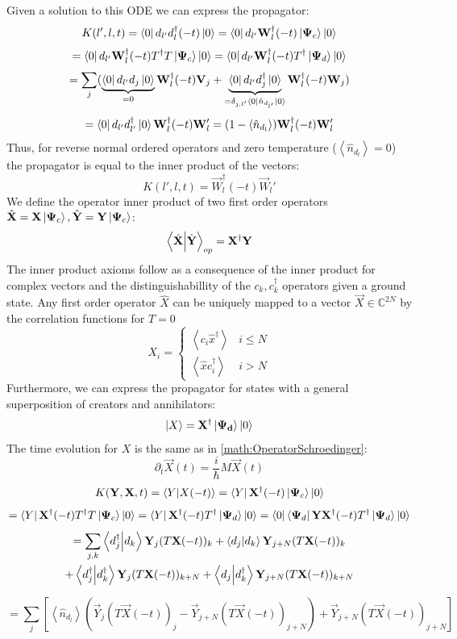 \documentclass[Master]{subfiles}
\begin{document}
Given a  solution to this ODE we can express the propagator:
$$
K(l',l,t) =
\bra{0}d_{l'}
d^{\dag}_l(-t)\ket{0} 
= 
\bra{0}d_{l'}\mathbf{W}^{\dag}_l(-t)\ket{\mathbf{\Psi}_c}\ket{0} 
$$
$$
= 
\bra{0}d_{l'}\mathbf{W}^{\dag}_l(-t)T^{\dag} T \ket{\mathbf{\Psi}_c}\ket{0} 
=
\bra{0}d_{l'}\mathbf{W}^{\dag}_l(-t)T^{\dag} \ket{\mathbf{\Psi}_d}\ket{0}
$$
$$
= \sum_j ( \underbrace{\bra{0}d_{l'}d_{j}\ket{0}}_{=0} \mathbf{W}^{\dag}_l(-t) \mathbf{V}_j + \underbrace{\bra{0}d_{l'}d^{\dag}_{j}\ket{0}}_{= \delta_{j,l'}\bra{0}\hat{n}_{d_{l'}}\ket{0}}\mathbf{W}^{\dag}_l(-t) \mathbf{W}_j) 
$$
$$
= \bra{0}d_{l'}d^{\dag}_{l'}\ket{0} \mathbf{W}^{\dag}_l(-t) \mathbf{W}_l'  = (1- \left< \hat{n}_{d_l}\right>)\mathbf{W}^{\dag}_l(-t) \mathbf{W}_l' 
$$
Thus, for reverse normal ordered operators and zero temperature ($\left< \hat{n}_{d_l}\right>=0$) the propagator is equal to the inner product of the vectors:
\begin{dmath}\label{BdG:Prop=Scal}
 K(l',l,t) = \vec{W}^{\dag}_l(-t) \vec{W}_l'
\end{dmath}
We define the operator inner product of two first order operators \\ $\hat{\mathbf{X}} = \mathbf{X}\ket{\mathbf{\Psi}_c},\hat{\mathbf{Y}}= \mathbf{Y}\ket{\mathbf{\Psi}_c}$:
$$\braket{\hat{\mathbf{X}}}{{\hat{\mathbf{Y}}}}_{op} = \mathbf{X}^{\dag}\mathbf{Y}$$
The inner product axioms follow as a consequence of the inner product for complex vectors and the distinguishabillity of the $c_k,c_k^{\dag}$ operators given a ground state.
Any first order operator $\hat{X}$ can be uniquely mapped to a vector $\vec{X} \in \mathbb{C}^{2 N}$ by the correlation functions for $T=0$
$$
X_i = \begin{cases}
\left< c_i \hat{x}^{\dag} \right> & i \leq N\\
\left< \hat{x} c_i^{\dag}\right> & i > N
\end{cases}
$$
Furthermore, we can express the propagator for states with a general superposition of creators and annihilators:\\ $$\ket{X}=\mathbf{X}^{\dag}\ket{\mathbf{\Psi_d}}\ket{0}$$
The time evolution for $X$ is the same as in \eqref{math:OperatorSchroedinger}:
$$
\partial_t  \vec{X}(t) = \frac{i}{\hbar} M  \vec{X}(t)
$$
$$
K(\mathbf{Y},\mathbf{X},t) 
= \braket{Y}{X(-t)}
=
\bra{Y}\mathbf{X}^{\dag}(-t)\ket{\mathbf{\Psi}_c}\ket{0} 
$$
$$
= 
\bra{Y}\vec{X}^{\dag}(-t)T^{\dag} T \ket{\vec{\Psi}_c}\ket{0} 
=
\bra{Y}\vec{X}^{\dag}(-t)T^{\dag} \ket{\vec{\Psi}_d}\ket{0}
=\bra{0}\bra{\vec{\Psi}_d}\Vec{Y}\vec{X}^{\dag}(-t)T^{\dag} \ket{\vec{\Psi}_d}\ket{0} 
$$
\begin{multline}
= \sum_{j,k}
\braket{d_j^{\dag}}{d_k}\mathbf{Y}_j (T \mathbf{X}(-t))_k
+\braket{d_j}{d_k}\mathbf{Y}_{j+N} (T \mathbf{X}(-t))_k \\
+\braket{d_j^{\dag}}{d_k^{\dag}}\mathbf{Y}_j (T \mathbf{X}(-t))_{k+N}
+\braket{d_j}{d_k^{\dag}}\mathbf{Y}_{j+N} (T \mathbf{X}(-t))_{k+N}
\end{multline}

\begin{equation}
= \sum_{j} \left[
\left< \hat{n}_{d_l} \right> (\vec{Y}_j (T \vec{X}(-t))_j - \vec{Y}_{j+N} (T \vec{X}(-t))_{j+N} )
+\vec{Y}_{j+N} (T \vec{X}(-t))_{j+N}
\right]
\end{equation}
\end{document}
